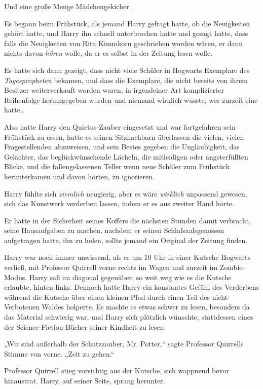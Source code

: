 {Und eine große Menge Mädchengekicher.

Es begann beim Frühstück, als jemand Harry gefragt hatte, ob die Neuigkeiten gehört hatte, und Harry ihn schnell unterbrochen hatte und gesagt hatte, dass falls die Neuigkeiten von Rita Kimmkorn geschrieben worden wären, er dann nichts davon \emph{hören} wolle, da er es selbst in der Zeitung lesen wolle.

Es hatte sich dann gezeigt, dass nicht viele Schüler in Hogwarts Exemplare des \emph{Tagespropheten} bekamen, und dass die Exemplare, die nicht bereits von ihrem Besitzer weiterverkauft worden waren, in irgendeiner Art komplizierter Reihenfolge herumgegeben wurden und niemand wirklich wusste, wer zurzeit eine hatte…

Also hatte Harry den Quietus-Zauber eingesetzt und war fortgefahren sein Frühstück zu essen, hatte es seinen Sitznachbarn überlassen die vielen, vielen Fragestellenden abzuweisen, und sein Bestes gegeben die Ungläubigkeit, das Gelächter, das beglückwünschende Lächeln, die mitleidigen oder angsterfüllten Blicke, und die fallengelassenen Teller wenn neue Schüler zum Frühstück herunterkamen und davon hörten, zu ignorieren.

Harry fühlte sich \emph{ziemlich} neugierig, aber es wäre \emph{wirklich} unpassend gewesen, sich das Kunstwerk verderben lassen, indem er es aus zweiter Hand hörte.

Er hatte in der Sicherheit seines Koffers die nächsten Stunden damit verbracht, seine Hausaufgaben zu machen, nachdem er seinen Schlafsaalsgenossen aufgetragen hatte, ihn zu holen, sollte jemand ein Original der Zeitung finden.

Harry war noch immer unwissend, als er um 10 Uhr in einer Kutsche Hogwarts verließ, mit Professor Quirrell vorne rechts im Wagen und zurzeit im Zombie-Modus. Harry saß im diagonal gegenüber, so weit weg wie es die Kutsche erlaubte, hinten links. Dennoch hatte Harry ein konstantes Gefühl des Verderbens während die Kutsche über einen kleinen Pfad durch einen Teil des nicht-Verbotenen Waldes holperte. Es machte es etwas schwer zu lesen, besonders da das Material schwierig war, und Harry sich plötzlich wünschte, stattdessen eines der Science-Fiction-Bücher seiner Kindheit zu lesen \later

„Wir sind außerhalb der Schutzzauber, Mr. Potter,“ sagte Professor Quirrells Stimme von vorne. „Zeit zu gehen.“

Professor Quirrell stieg vorsichtig aus der Kutsche, sich wappnend bevor hinaustrat. Harry, auf seiner Seite, sprang herunter.

}
